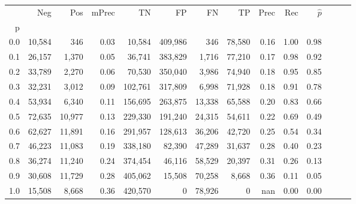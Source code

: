 \begin{tabular}{rrrrrrrrrrrrrr}
\toprule
{} &     Neg &     Pos & mPrec &       TN &       FP &      FN &      TP &  Prec &   Rec & $\hat{p}$ \\
p   &         &         &       &          &          &         &         &       &       &           \\
\midrule
0.0 &  10,584 &     346 &  0.03 &   10,584 &  409,986 &     346 &  78,580 &  0.16 &  1.00 &      0.98 \\
0.1 &  26,157 &   1,370 &  0.05 &   36,741 &  383,829 &   1,716 &  77,210 &  0.17 &  0.98 &      0.92 \\
0.2 &  33,789 &   2,270 &  0.06 &   70,530 &  350,040 &   3,986 &  74,940 &  0.18 &  0.95 &      0.85 \\
0.3 &  32,231 &   3,012 &  0.09 &  102,761 &  317,809 &   6,998 &  71,928 &  0.18 &  0.91 &      0.78 \\
0.4 &  53,934 &   6,340 &  0.11 &  156,695 &  263,875 &  13,338 &  65,588 &  0.20 &  0.83 &      0.66 \\
0.5 &  72,635 &  10,977 &  0.13 &  229,330 &  191,240 &  24,315 &  54,611 &  0.22 &  0.69 &      0.49 \\
0.6 &  62,627 &  11,891 &  0.16 &  291,957 &  128,613 &  36,206 &  42,720 &  0.25 &  0.54 &      0.34 \\
0.7 &  46,223 &  11,083 &  0.19 &  338,180 &   82,390 &  47,289 &  31,637 &  0.28 &  0.40 &      0.23 \\
0.8 &  36,274 &  11,240 &  0.24 &  374,454 &   46,116 &  58,529 &  20,397 &  0.31 &  0.26 &      0.13 \\
0.9 &  30,608 &  11,729 &  0.28 &  405,062 &   15,508 &  70,258 &   8,668 &  0.36 &  0.11 &      0.05 \\
1.0 &  15,508 &   8,668 &  0.36 &  420,570 &        0 &  78,926 &       0 &   nan &  0.00 &      0.00 \\
\bottomrule
\end{tabular}
